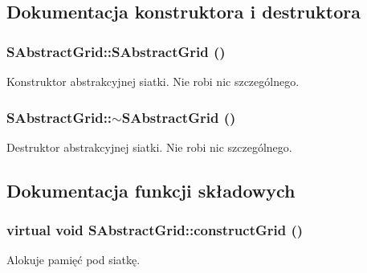 \subsection{Dokumentacja konstruktora i destruktora}
\hypertarget{classSAbstractGrid_2df5b6a5bd2a11d9015104f3dd6afc20}{
\subsubsection[{SAbstractGrid}]{\setlength{\rightskip}{0pt plus 5cm}SAbstractGrid::SAbstractGrid ()}}
\label{classSAbstractGrid_2df5b6a5bd2a11d9015104f3dd6afc20}


Konstruktor abstrakcyjnej siatki. Nie robi nic szczególnego. \hypertarget{classSAbstractGrid_7391180cba323fbd0d64d23157c8a6a6}{
\subsubsection[{$\sim$SAbstractGrid}]{\setlength{\rightskip}{0pt plus 5cm}SAbstractGrid::$\sim$SAbstractGrid ()}}
\label{classSAbstractGrid_7391180cba323fbd0d64d23157c8a6a6}


Destruktor abstrakcyjnej siatki. Nie robi nic szczególnego. 

\subsection{Dokumentacja funkcji składowych}
\hypertarget{classSAbstractGrid_919248aad138ffb1c969e73c3e637dcd}{
\subsubsection[{constructGrid}]{\setlength{\rightskip}{0pt plus 5cm}virtual void SAbstractGrid::constructGrid ()}}
\label{classSAbstractGrid_919248aad138ffb1c969e73c3e637dcd}


Alokuje pamięć pod siatkę. 

